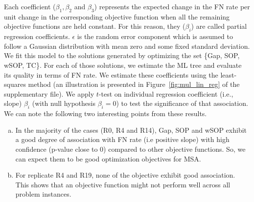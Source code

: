 Each coefficient ($\beta_1, \beta_2$ and $\beta_3$) represents the expected change in the FN rate per unit change in the corresponding objective function when all the remaining objective functions are held constant. For this reason, they ($\beta_i$) are called partial regression coefficients. $\epsilon$ is the random error component which is assumed to follow a Gaussian distribution with mean zero and some fixed standard deviation. We fit this model to the solutions generated by optimizing the set \{Gap, SOP, wSOP, TC\}. For each of those solutions, we estimate the ML tree and evaluate its quality in terms of FN rate.  
We estimate these coefficients using the least-squares method (an illustration is presented in Figure~\ref{fig:mul_lin_reg} of the supplementary file). We apply $t$-test on individual regression coefficient (i.e., slope) $\beta_i$ (with null hypothesis $\beta_i=0$) to test the significance of that association. We can note the following two interesting points from these results.
\begin{enumerate}[(a)]
	\item In the majority of the cases (R0, R4 and R14), Gap, SOP and wSOP exhibit a good degree of association with FN rate (i.e positive slope) with high confidence (p-value close to 0) compared to other objective functions. So, we can expect them to be good optimization objectives for MSA.
	\item For replicate R4 and R19, none of the objective exhibit good association. This shows that an objective function might not perform well across all problem instances. 
\end{enumerate}

